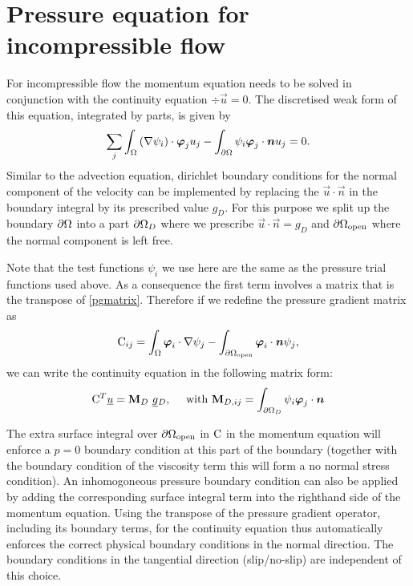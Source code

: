 \section{Pressure equation for incompressible flow}
For incompressible flow the momentum equation needs to be solved 
in conjunction with the continuity equation 
$\div\vec u=0$. The discretised weak form of 
this equation, integrated by parts, is given by
\begin{equation*}
  \sum_j \int_\Omega \left(\nabla\psi_i\right)\cdot{\mbox{\boldmath$\varphi$}}_j u_j - 
    \int_{\partial\Omega} \psi_i{\mbox{\boldmath$\varphi$}}_j\cdot{\mbox{\boldmath$n$}} u_j = 0.
\end{equation*}
Similar to the advection equation, dirichlet boundary conditions for the 
normal component of the velocity can be implemented by replacing
the $\vec u\cdot\vec n$ in the boundary integral by its prescribed 
value $g_D$. For this purpose we split up the 
boundary ${\partial\Omega}$ into a part
${\partial\Omega}_D$ where we prescribe $\vec u\cdot\vec n=g_D$ and 
${\partial\Omega}_{\mathrm{open}}$ where the normal component is left free.

Note that the test functions $\psi_i$ we use here are the 
same as the pressure trial functions used above. As a consequence
the first term involves a matrix that is the
transpose of \eqref{pgmatrix}. Therefore if we redefine the pressure 
gradient matrix as
\begin{equation*}
  \mathrm{C}_{ij}=\int_\Omega {\mbox{\boldmath$\varphi$}}_i\cdot\nabla\psi_j 
    -\int_{{\partial\Omega}_{\mathrm{open}}} {\mbox{\boldmath$\varphi$}}_i\cdot{\mbox{\boldmath$n$}}\psi_j ,
\end{equation*}
we can write the continuity equation in the following matrix form:
\begin{equation}
  \mathrm{C}^T \underline{u}=
    {\mbox{\boldmath$\mathrm{M}$}}_D ~\underline{g}{}_D, 
    \quad\text{ with }
    {\mbox{\boldmath$\mathrm{M}$}}_{D,ij}=\int_{{\partial\Omega}_D} \psi_i{\mbox{\boldmath$\varphi$}}_j\cdot{\mbox{\boldmath$n$}}
  \label{discrete_incompressible_continuity}
\end{equation}

The extra surface integral over ${\partial\Omega}_{\mathrm{open}}$ in 
$\mathrm{C}$ in the momentum equation will enforce
a $p=0$ boundary condition at this part of the boundary (together with the
boundary condition of the viscosity term this will form a no normal stress 
condition). An inhomogoneous pressure boundary condition can also 
be applied by adding the corresponding
surface integral term into the righthand side of the momentum equation.
Using the transpose of the pressure gradient operator, including its
boundary terms, for the continuity equation thus automatically 
enforces the correct physical boundary conditions in the normal 
direction. 
The boundary 
conditions in the tangential direction (slip/no-slip) are independent of this choice.

